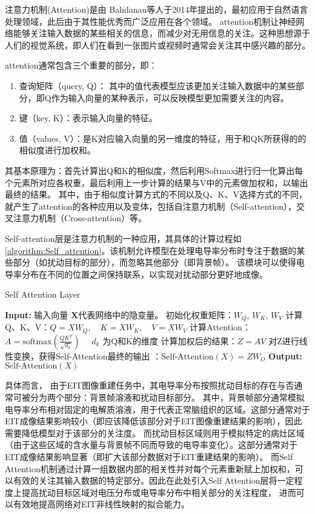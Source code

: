 注意力机制(Attention)是由 Bahdanau等人于2014年提出的\cite{2014Neural}，最初应用于自然语言处理领域，此后由于其性能优秀而广泛应用在各个领域。
attention机制让神经网络能够关注输入数据的某些相关的信息，而减少对无用信息的关注。这种思想源于人们的视觉系统，即人们在看到一张图片或视频时通常会关注其中感兴趣的部分。

attention通常包含三个重要的部分，即：
\begin{enumerate}
  \item 查询矩阵（query, Q）： 其中的值代表模型应该更加关注输入数据中的某些部分，即Q作为输入向量的某种表示，可以反映模型更加需要关注的内容。
  \item 键（key, K）：表示输入向量的特征。
  \item 值（values, V）：是K对应输入向量的另一维度的特征，用于和QK所获得的的相似度进行加权和。
\end{enumerate}

其基本原理为：首先计算出Q和K的相似度，然后利用Softmax进行归一化算出每个元素所对应各权重，最后利用上一步计算的结果与V中的元素做加权和，以输出最终的结果。
其中，由于相似度计算方式的不同以及Q、K、V选择方式的不同，就产生了attention的各种应用以及变体，包括自注意力机制（Self-attention），交叉注意力机制（Cross-attention）等。

Self-attention层是注意力机制的一种应用，其具体的计算过程如\cref{algorithm:Self_attention}。该机制允许模型在处理电导率分布时专注于数据的某些部分（如扰动目标的部分），而忽略其他部分（即背景帧）。
该模块可以使得电导率分布在不同的位置之间保持联系，以实现对扰动部分更好地成像。

\begin{algorithm}

\caption{Self Attention Layer}
\begin{algorithmic}[1]
    \State \textbf{Input:} 输入向量 $\boldsymbol{X}$代表网络中的隐变量。
    \State 初始化权重矩阵：$W_Q$, $W_K$, $W_V$
    \State 计算Q、K、V：$Q = XW_Q, \quad K = XW_K, \quad V = XW_V$
    \State 计算Attention：$A = \text{softmax}\left(\frac{QK^T}{\sqrt{d_k}}\right) \quad $ $d_k$ 为Q和K的维度 
    \State 计算加权后的结果：$Z = AV$
    \State 对Z进行线性变换，获得Self-Attention最终的输出 ：$\text{Self-Attention}(X) = ZW_O$
    \State \textbf{Output:} $\text{Self-Attention}(X)$
\end{algorithmic}
\label{algorithm:Self_attention}
\end{algorithm}

具体而言， 由于EIT图像重建任务中，其电导率分布按照扰动目标的存在与否通常可被分为两个部分：背景帧溶液和扰动目标部分。
其中，背景帧部分通常模拟电导率分布相对固定的电解质溶液，用于代表正常脑组织的区域。这部分通常对于EIT成像结果影响较小（即应该降低该部分对于EIT图像重建结果的影响），因此需要降低模型对于该部分的关注度。
而扰动目标区域则用于模拟特定的病灶区域（由于这些区域的含水量与背景帧不同而导致的电导率变化）。这部分通常对于EIT成像结果影响显著（即扩大该部分数据对于EIT重建结果的影响）。
而Self Attention机制通过计算一组数据内部的相关性并对每个元素重新赋上加权和，可以有效的关注其输入数据的特定部分。因此在此处引入Self Attention层将一定程度上提高扰动目标区域对电压分布或电导率分布中相关部分的关注程度，
进而可以有效地提高网络对EIT非线性映射的拟合能力。

